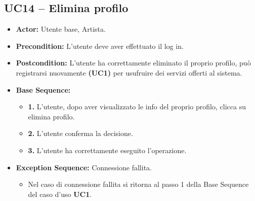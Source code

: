 \subsection{UC14 -- Elimina profilo}
\begin{itemize}
    \item \textbf{Actor:} Utente base, Artista.
    \item \textbf{Precondition:} L'utente deve aver effettuato il log in.
    \item \textbf{Postcondition:} L'utente ha correttamente eliminato il proprio profilo, può registrarsi nuovamente \textbf{(UC1)} per usufruire dei servizi offerti al sistema. 
    \item \textbf{Base Sequence:}
    \begin{itemize}
        \item \textbf{1.} L'utente, dopo aver visualizzato le info del proprio profilo, clicca su elimina profilo.
        \item \textbf{2.} L'utente conferma la decisione.
        \item \textbf{3.} L'utente ha correttamente eseguito l'operazione.
    \end{itemize}
    \item \textbf{Exception Sequence:} Connessione fallita.
    \begin{itemize}
        \item Nel caso di connessione fallita si ritorna al passo 1 della Base Sequence del caso d'uso \textbf{UC1}.
    \end{itemize}
\end{itemize}
\vspace{1cm}

